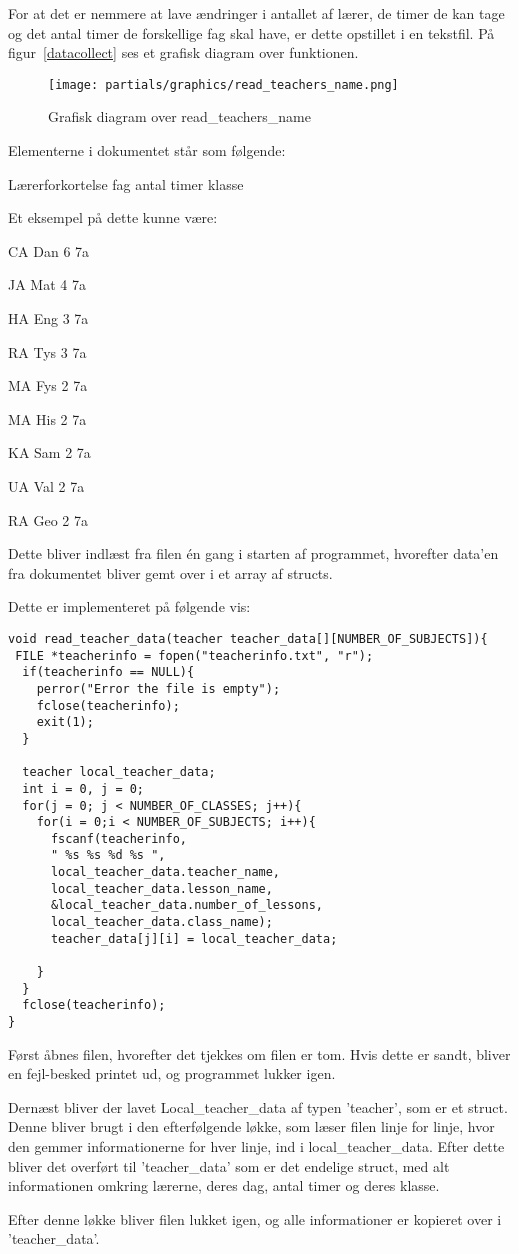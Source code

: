 For at det er nemmere at lave ændringer i antallet af lærer, de timer de kan tage og det antal timer de forskellige fag skal have, er dette opstillet i en tekstfil. På figur~\ref{datacollect} ses et grafisk diagram over funktionen.
\begin{figure}[!h]
\texttt{[image: partials/graphics/read\_teachers\_name.png]}
\caption{Grafisk diagram over read_teachers_name}
\label{fig:datacollect}
\end{figure}
Elementerne i dokumentet står som følgende:

Lærerforkortelse fag antal timer klasse

Et eksempel på dette kunne være:

    CA Dan 6 7a

    JA Mat 4 7a

    HA Eng 3 7a

    RA Tys 3 7a

    MA Fys 2 7a

    MA His 2 7a

    KA Sam 2 7a

    UA Val 2 7a

    RA Geo 2 7a

Dette bliver indlæst fra filen én gang i starten af programmet, hvorefter data’en fra dokumentet bliver gemt over i et array af structs.

Dette er implementeret på følgende vis:

\begin{lstlisting}
void read_teacher_data(teacher teacher_data[][NUMBER_OF_SUBJECTS]){
 FILE *teacherinfo = fopen("teacherinfo.txt", "r");
  if(teacherinfo == NULL){
    perror("Error the file is empty");
    fclose(teacherinfo);
    exit(1);
  }

  teacher local_teacher_data;
  int i = 0, j = 0;
  for(j = 0; j < NUMBER_OF_CLASSES; j++){
    for(i = 0;i < NUMBER_OF_SUBJECTS; i++){
      fscanf(teacherinfo,
      " %s %s %d %s ",
      local_teacher_data.teacher_name, 
      local_teacher_data.lesson_name, 
      &local_teacher_data.number_of_lessons, 
      local_teacher_data.class_name);
      teacher_data[j][i] = local_teacher_data; 
  
    } 
  }  
  fclose(teacherinfo);
}
\end{lstlisting}

Først åbnes filen, hvorefter det tjekkes om filen er tom. Hvis dette er sandt, bliver en fejl-besked printet ud, og programmet lukker igen.

Dernæst bliver der lavet Local\_teacher\_data af typen ’teacher’, som er et struct. Denne bliver brugt i den efterfølgende løkke, som læser filen linje for linje, hvor den gemmer informationerne for hver linje, ind i local\_teacher\_data. Efter dette bliver det overført til ’teacher\_data’ som er det endelige struct, med alt informationen omkring lærerne, deres dag, antal timer og deres klasse.
 
Efter denne løkke bliver filen lukket igen, og alle informationer er kopieret over i ’teacher\_data’.